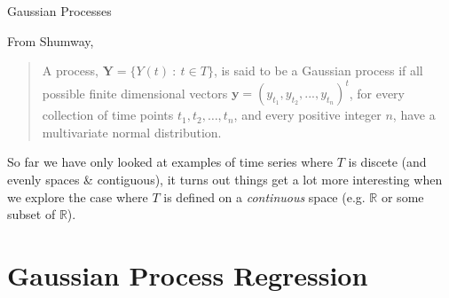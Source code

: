 \documentclass[11pt,ignorenonframetext,]{beamer}
\begin{document}
\begin{frame}[t]{Gaussian Processes}
\protect\hypertarget{gaussian-processes}{}

From Shumway,

\vspace{5mm}

\begin{quote}
A process, \(\symbf{Y} = \{Y(t) ~:~ t \in T\}\), is said to be a
Gaussian process if all possible finite dimensional vectors
\(\symbf{y} = (y_{t_1},y_{t_2},...,y_{t_n})^t\), for every collection of
time points \(t_1, t_2, \ldots , t_n\), and every positive integer
\(n\), have a multivariate normal distribution.
\end{quote}

\pause

So far we have only looked at examples of time series where \(T\) is
discete (and evenly spaces \& contiguous), it turns out things get a lot
more interesting when we explore the case where \(T\) is defined on a
\emph{continuous} space (e.g. \(\mathbb{R}\) or some subset of
\(\mathbb{R}\)).

\end{frame}

\hypertarget{gaussian-process-regression}{%
\section{Gaussian Process
Regression}\label{gaussian-process-regression}}
\end{document}
